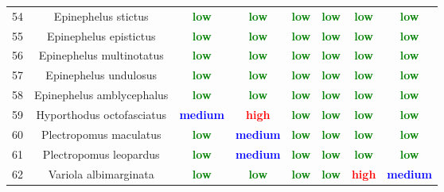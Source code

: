 \documentclass{report}\usepackage[]{graphicx}\usepackage[]{color}
\begin{document}
\begin{table}[ht]
{\begin{tabular}{cccccccc}
   54 & Epinephelus stictus & \textcolor{green}{\textbf{low}} & \textcolor{green}{\textbf{low}} & \textcolor{green}{\textbf{low}} & \textcolor{green}{\textbf{low}} & \textcolor{green}{\textbf{low}} & \textcolor{green}{\textbf{low}} \\ 
   55 & Epinephelus epistictus & \textcolor{green}{\textbf{low}} & \textcolor{green}{\textbf{low}} & \textcolor{green}{\textbf{low}} & \textcolor{green}{\textbf{low}} & \textcolor{green}{\textbf{low}} & \textcolor{green}{\textbf{low}} \\ 
   56 & Epinephelus multinotatus & \textcolor{green}{\textbf{low}} & \textcolor{green}{\textbf{low}} & \textcolor{green}{\textbf{low}} & \textcolor{green}{\textbf{low}} & \textcolor{green}{\textbf{low}} & \textcolor{green}{\textbf{low}} \\ 
   57 & Epinephelus undulosus & \textcolor{green}{\textbf{low}} & \textcolor{green}{\textbf{low}} & \textcolor{green}{\textbf{low}} & \textcolor{green}{\textbf{low}} & \textcolor{green}{\textbf{low}} & \textcolor{green}{\textbf{low}} \\ 
   58 & Epinephelus amblycephalus & \textcolor{green}{\textbf{low}} & \textcolor{green}{\textbf{low}} & \textcolor{green}{\textbf{low}} & \textcolor{green}{\textbf{low}} & \textcolor{green}{\textbf{low}} & \textcolor{green}{\textbf{low}} \\ 
   59 & Hyporthodus octofasciatus & \textcolor{blue}{\textbf{medium}} & \textcolor{red}{\textbf{high}} & \textcolor{green}{\textbf{low}} & \textcolor{green}{\textbf{low}} & \textcolor{green}{\textbf{low}} & \textcolor{green}{\textbf{low}} \\ 
   60 & Plectropomus maculatus & \textcolor{green}{\textbf{low}} & \textcolor{blue}{\textbf{medium}} & \textcolor{green}{\textbf{low}} & \textcolor{green}{\textbf{low}} & \textcolor{green}{\textbf{low}} & \textcolor{green}{\textbf{low}} \\ 
   61 & Plectropomus leopardus & \textcolor{green}{\textbf{low}} & \textcolor{blue}{\textbf{medium}} & \textcolor{green}{\textbf{low}} & \textcolor{green}{\textbf{low}} & \textcolor{green}{\textbf{low}} & \textcolor{green}{\textbf{low}} \\ 
   62 & Variola albimarginata & \textcolor{green}{\textbf{low}} & \textcolor{green}{\textbf{low}} & \textcolor{green}{\textbf{low}} & \textcolor{green}{\textbf{low}} & \textcolor{red}{\textbf{high}} & \textcolor{blue}{\textbf{medium}} \\ 
   \hline
\end{tabular}
}
\end{table}
\end{document}
